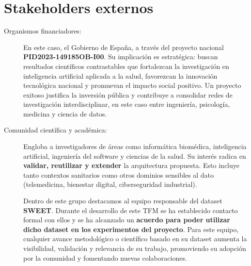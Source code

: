 \documentclass{report}
\begin{document}
\section*{Stakeholders externos}

\begin{description}
  \item[Organismos financiadores:]  
  En este caso, el Gobierno de España, a través del proyecto nacional \textbf{PID2023-149185OB-I00}.  
  Su implicación es estratégica: buscan resultados científicos contrastables que fortalezcan la investigación en inteligencia artificial aplicada a la salud, favorezcan la innovación tecnológica nacional y promuevan el impacto social positivo.  
  Un proyecto exitoso justifica la inversión pública y contribuye a consolidar redes de investigación interdisciplinar, en este caso entre ingeniería, psicología, medicina y ciencia de datos.



 \item[Comunidad científica y académica:]  
  Engloba a investigadores de áreas como informática biomédica, inteligencia artificial, ingeniería del software y ciencias de la salud.  
  Su interés radica en \textbf{validar, reutilizar y extender} la arquitectura propuesta.  
  Esto incluye tanto contextos sanitarios como otros dominios sensibles al dato (telemedicina, bienestar digital, ciberseguridad industrial).

  Dentro de este grupo destacamos al equipo responsable del dataset \textbf{SWEET}.  
  Durante el desarrollo de este TFM se ha establecido contacto formal con ellos y se ha alcanzado un \textbf{acuerdo para poder utilizar dicho dataset en los experimentos del proyecto}.  
  Para este equipo, cualquier avance metodológico o científico basado en su dataset aumenta la visibilidad, validación y relevancia de su trabajo, promoviendo su adopción por la comunidad y fomentando nuevas colaboraciones.


\end{description}
\end{document}

